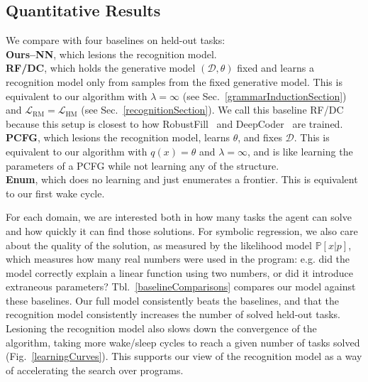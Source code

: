 \documentclass{article}
\newcommand{\probability}{\mathds{P}} %
\begin{document}
\subsection{Quantitative Results}\label{quantitative}

We compare  with four baselines on  held-out tasks:
\\\noindent \textbf{Ours--NN}, which lesions the recognition model.
\\\noindent \textbf{RF/DC}, which holds the generative model $(\mathcal{D},\theta)$ fixed and learns
a recognition model only from samples from the fixed generative model.
This is equivalent to our algorithm with $\lambda = \infty$ (see Sec.~\ref{grammarInductionSection})
and $\mathcal{L}_{\text{RM}} = \mathcal{L}_{\text{HM}}$ (see Sec.~\ref{recognitionSection}).
We call this baseline RF/DC because
this setup is closest to how RobustFill~\cite{devlin2017robustfill} and DeepCoder~\cite{balog2016deepcoder} are trained.
\\\noindent \textbf{PCFG}, which lesions the recognition model, learns $\theta$, and fixes $\mathcal{D}$.
This is equivalent to our algorithm with $q(x) = \theta$ and $\lambda = \infty$,
and is like learning the parameters of a PCFG while not learning any of the structure.
\\\noindent \textbf{Enum}, which does no learning and just enumerates a frontier.
This is equivalent to our first wake cycle.

For each domain,
we are interested both in how many tasks the
agent can solve and how quickly it can find those solutions.
For symbolic regression, we also care about the quality
of the solution, as measured by the likelihood model $\probability[x|p]$,
which measures how many
real numbers were used in the program: e.g. did the model correctly explain a linear function
using two numbers, or did it introduce extraneous parameters?
Tbl.~\ref{baselineComparisons}
compares our model against these baselines.
Our full model consistently
beats the baselines,
and that the recognition model 
consistently increases the number of solved held-out tasks.
Lesioning the recognition model also slows down the convergence of the algorithm,
taking more wake/sleep cycles to reach a given number of tasks solved (Fig.~\ref{learningCurves}).
This supports our view of the recognition model as a way of accelerating the search over programs.
\end{document}
